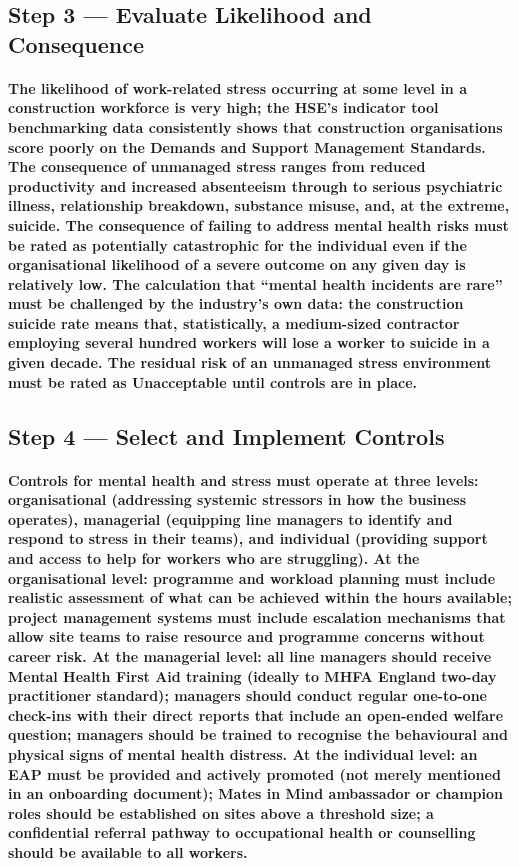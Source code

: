 \subsection{Step 3 --- Evaluate Likelihood and Consequence}
\paragraph{The likelihood of work-related stress occurring at some level in a construction workforce is very high; the HSE's indicator tool benchmarking data consistently shows that construction organisations score poorly on the Demands and Support Management Standards. The consequence of unmanaged stress ranges from reduced productivity and increased absenteeism through to serious psychiatric illness, relationship breakdown, substance misuse, and, at the extreme, suicide. The consequence of failing to address mental health risks must be rated as potentially catastrophic for the individual even if the organisational likelihood of a severe outcome on any given day is relatively low. The calculation that ``mental health incidents are rare'' must be challenged by the industry's own data: the construction suicide rate means that, statistically, a medium-sized contractor employing several hundred workers will lose a worker to suicide in a given decade. The residual risk of an unmanaged stress environment must be rated as Unacceptable until controls are in place.}

\subsection{Step 4 --- Select and Implement Controls}
\paragraph{Controls for mental health and stress must operate at three levels: organisational (addressing systemic stressors in how the business operates), managerial (equipping line managers to identify and respond to stress in their teams), and individual (providing support and access to help for workers who are struggling). At the organisational level: programme and workload planning must include realistic assessment of what can be achieved within the hours available; project management systems must include escalation mechanisms that allow site teams to raise resource and programme concerns without career risk. At the managerial level: all line managers should receive Mental Health First Aid training (ideally to MHFA England two-day practitioner standard); managers should conduct regular one-to-one check-ins with their direct reports that include an open-ended welfare question; managers should be trained to recognise the behavioural and physical signs of mental health distress. At the individual level: an EAP must be provided and actively promoted (not merely mentioned in an onboarding document); Mates in Mind ambassador or champion roles should be established on sites above a threshold size; a confidential referral pathway to occupational health or counselling should be available to all workers.}

